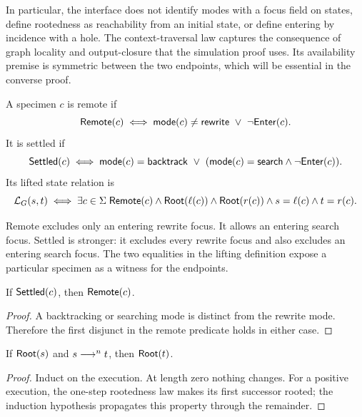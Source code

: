 In particular, the interface does not identify modes with a focus field on
states, define rootedness as reachability from an initial state, or define
entering by incidence with a hole. The context-traversal law captures the
consequence of graph locality and output-closure that the simulation proof
uses. Its availability premise is symmetric between the two endpoints,
which will be essential in the converse proof.

\begin{definition}\label{term:lifting}
A specimen $c$ is remote if
\[
 \mathsf{Remote}(c)\iff \mathsf{mode}(c)\ne\mathsf{rewrite}\ \lor\ \neg\mathsf{Enter}(c).
\]
It is settled if
\[
 \mathsf{Settled}(c)\iff \mathsf{mode}(c)=\mathsf{backtrack}\ \lor\
   (\mathsf{mode}(c)=\mathsf{search}\land\neg\mathsf{Enter}(c)).
\]
Its lifted state relation is
\[
 \mathcal L_G(s,t)\iff\exists c\in\Sigma\;
  \mathsf{Remote}(c)\land\mathsf{Root}(\ell(c))\land\mathsf{Root}(r(c))
  \land s=\ell(c)\land t=r(c).
\]
\end{definition}
Remote excludes only an entering rewrite focus. It allows an entering
search focus. Settled is stronger: it excludes every rewrite focus and
also excludes an entering search focus. The two equalities in the lifting
definition expose a particular specimen as a witness for the endpoints.

\begin{lemma}
If $\mathsf{Settled}(c)$, then $\mathsf{Remote}(c)$.
\end{lemma}
\begin{proof}
A backtracking or searching mode is distinct from the rewrite mode.
Therefore the first disjunct in the remote predicate holds in either case.
\end{proof}

\begin{lemma}
If $\mathsf{Root}(s)$ and $s\mathrel{\longrightarrow^{n}}t$, then $\mathsf{Root}(t)$.
\end{lemma}
\begin{proof}
Induct on the execution. At length zero nothing changes. For a positive
execution, the one-step rootedness law makes its first successor rooted;
the induction hypothesis propagates this property through the remainder.
\end{proof}


